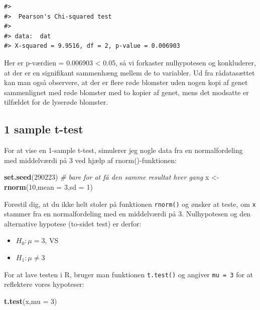\documentclass[
]{book}
\newenvironment{Shaded}{\begin{snugshade}}{\end{snugshade}}
\newcommand{\AttributeTok}[1]{\textcolor[rgb]{0.27,0.27,0.27}{#1}}
\newcommand{\CommentTok}[1]{\textcolor[rgb]{0.37,0.37,0.37}{\textit{#1}}}
\newcommand{\DecValTok}[1]{\textcolor[rgb]{0.06,0.06,0.06}{#1}}
\newcommand{\FunctionTok}[1]{\textcolor[rgb]{0.27,0.27,0.27}{\textbf{#1}}}
\newcommand{\NormalTok}[1]{#1}
\newcommand{\OtherTok}[1]{\textcolor[rgb]{0.37,0.37,0.37}{#1}}
\providecommand{\tightlist}{%
  \setlength{\itemsep}{0pt}\setlength{\parskip}{0pt}}
\begin{document}
\begin{verbatim}
#> 
#>  Pearson's Chi-squared test
#> 
#> data:  dat
#> X-squared = 9.9516, df = 2, p-value = 0.006903
\end{verbatim}

Her er p-værdien = 0.006903 \textless{} 0.05, så vi forkaster nulhypotesen og konkluderer, at der er en signifikant sammenhæng mellem de to variabler. Ud fra rådatasættet kan man også observere, at der er flere røde blomster uden nogen kopi af genet sammenlignet med røde blomster med to kopier af genet, mens det modsatte er tilfældet for de lyserøde blomster.

\subsection{1 sample t-test}\label{sample-t-test}

For at vise en 1-sample t-test, simulerer jeg nogle data fra en normalfordeling med middelværdi på 3 ved hjælp af rnorm()-funktionen:

\begin{Shaded}
\begin{Highlighting}[]
\FunctionTok{set.seed}\NormalTok{(}\DecValTok{290223}\NormalTok{) }\CommentTok{\# bare for at få den samme resultat hver gang}
\NormalTok{x }\OtherTok{\textless{}{-}} \FunctionTok{rnorm}\NormalTok{(}\DecValTok{10}\NormalTok{,}\AttributeTok{mean =} \DecValTok{3}\NormalTok{,}\AttributeTok{sd =} \DecValTok{1}\NormalTok{)}
\end{Highlighting}
\end{Shaded}

Forestil dig, at du ikke helt stoler på funktionen \texttt{rnorm()} og ønsker at teste, om \texttt{x} stammer fra en normalfordeling med en middelværdi på 3. Nulhypotesen og den alternative hypotese (to-sidet test) er derfor:

\begin{itemize}
\tightlist
\item
  \(H_{0}: \mu = 3\), VS
\item
  \(H_{1}: \mu \neq 3\)
\end{itemize}

For at lave testen i R, bruger man funktionen \texttt{t.test()} og angiver \texttt{mu\ =\ 3} for at reflektere vores hypoteser:

\begin{Shaded}
\begin{Highlighting}[]
\FunctionTok{t.test}\NormalTok{(x,}\AttributeTok{mu =} \DecValTok{3}\NormalTok{)}
\end{Highlighting}
\end{Shaded}
\end{document}

